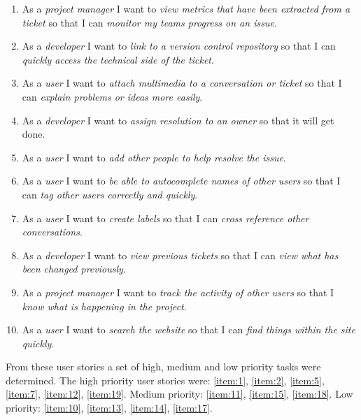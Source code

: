 \documentclass[a4paper]{l3proj}
\begin{document}
\begin{enumerate}[ref=\arabic*]
\item As a \textit{project manager} I want to \textit{view metrics that have been extracted from a ticket} so that I can \textit{monitor my teams progress on an issue}.\label{item:12}
\item As a \textit{developer} I want to \textit{link to a version control repository} so that I can \textit{quickly access the technical side of the ticket}.\label{item:13}
\item As a \textit{user} I want to \textit{attach multimedia to a conversation or ticket} so that I can \textit{explain problems or ideas more easily}.\label{item:14}
\item As a \textit{developer} I want to \textit{assign resolution to an owner} so that it will get done.\label{item:15}
\item As a \textit{user} I want to \textit{add other people to help resolve the issue}.\label{item:16}
\item As a \textit{user} I want to \textit{be able to autocomplete names of other users} so that I can \textit{tag other users correctly and quickly}.\label{item:17}
\item As a \textit{user} I want to \textit{create labels} so that I can \textit{cross reference other conversations}.\label{item:18}
\item As a \textit{developer} I want to \textit{view previous tickets} so that I can \textit{view what has been changed previously}.\label{item:19}
\item As a \textit{project manager} I want to \textit{track the activity of other users} so that I \textit{know what is happening in the project}.\label{item:20}
\item As a \textit{user} I want to \textit{search the website} so that I can \textit{find things within the site quickly}.\label{item:21}
\end{enumerate}

From these user stories a set of high, medium and low priority tasks were determined. The high priority user stories were: \ref{item:1}, \ref{item:2}, \ref{item:5}, \ref{item:7}, \ref{item:12}, \ref{item:19}. Medium priority: \ref{item:11}, \ref{item:15}, \ref{item:18}. Low priority: \ref{item:10}, \ref{item:13}, \ref{item:14}, \ref{item:17}.

\iffalse
\end{document}
